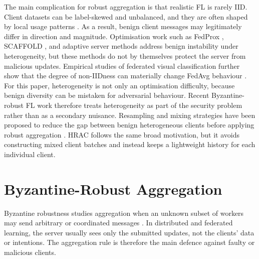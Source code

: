 The main complication for robust aggregation is that realistic FL is rarely
IID. Client datasets can be label-skewed and unbalanced, and they are often
shaped by local usage patterns \cite{KairouzMcMahanAvent:21}. As a result,
benign client messages may
legitimately differ in direction and magnitude. Optimisation work such as
FedProx \cite{li2020fedprox}, SCAFFOLD
\cite{DBLP:journals/corr/abs-1910-06378}, and adaptive server methods
\cite{reddi2021adaptive} address benign instability under heterogeneity, but
these methods do not by themselves protect the server from malicious updates.
Empirical studies of federated visual classification further show that the
degree of non-IIDness can materially change FedAvg behaviour
\cite{hsu2019noniidvisual}.
For this paper, heterogeneity is not only an optimisation difficulty, because benign diversity can be mistaken for adversarial
behaviour.
Recent Byzantine-robust FL work therefore treats heterogeneity as part of the
security problem rather than as a secondary nuisance. Resampling and mixing
strategies have been proposed to reduce the gap between benign heterogeneous
clients before applying robust aggregation
\cite{DBLP:journals/corr/abs-2006-09365,pmlr-v206-allouah23a}. HRAC follows
the same broad motivation, but it avoids constructing mixed client batches and
instead keeps a lightweight history for each individual client.

\section{Byzantine-Robust Aggregation}

Byzantine robustness studies aggregation when an unknown subset of workers may
send arbitrary or coordinated messages
\cite{10.1145/357172.357176,guerraoui2024primer}. In distributed and federated learning, the server usually sees only the submitted
updates, not the clients' data or intentions. The aggregation rule is therefore
the main defence against faulty or malicious clients. 


